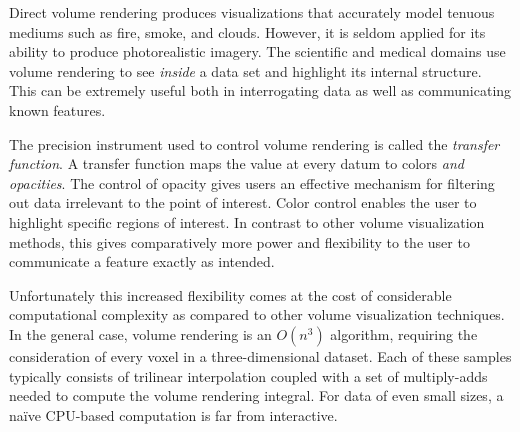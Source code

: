 
Direct volume rendering produces visualizations that accurately model
tenuous mediums such as fire, smoke, and clouds.  However, it is
seldom applied for its ability to produce photorealistic imagery.  The
scientific and medical domains use volume rendering to see
\emph{inside} a data set and highlight its internal structure.
This can be extremely useful both in interrogating data as well as
communicating known features.



The precision instrument used to control volume rendering is called the
\emph{transfer function}.  A transfer function maps the value at every
datum to colors \emph{and opacities}.  The control of opacity gives
users an effective mechanism for filtering out data irrelevant
to the point of interest.  Color control enables the user to
highlight specific regions of interest.  In contrast to other volume
visualization methods, this gives comparatively more power and
flexibility to the user to communicate a feature exactly as intended.

Unfortunately this increased flexibility comes at the cost of
considerable computational complexity as compared to other volume
visualization techniques.  In the general case, volume rendering is an
$O(n^3)$ algorithm, requiring the consideration of every voxel in a
three-dimensional dataset.  Each of these samples typically consists of
trilinear interpolation coupled with a set of multiply-adds needed to
compute the volume rendering integral.  For data of even small sizes, a
na\"ive CPU-based computation is far from interactive.



